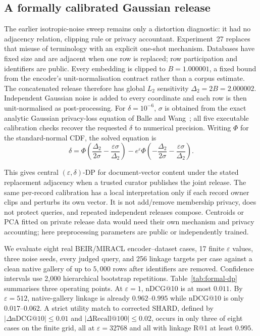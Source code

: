 \subsection{A formally calibrated Gaussian release}\label{ssec:shard-vs-dp}

The earlier isotropic-noise sweep remains only a distortion diagnostic: it
had no adjacency relation, clipping rule or privacy accountant. Experiment~27
replaces that misuse of terminology with an explicit one-shot mechanism.
Databases have fixed size and are adjacent when one row is replaced; row
participation and identifiers are public. Every embedding is clipped to
$B=1.000001$, a fixed bound from the encoder's unit-normalisation contract
rather than a corpus estimate. The concatenated release therefore has global
$L_2$ sensitivity $\Delta_2=2B=2.000002$. Independent Gaussian noise is added
to every coordinate and each row is then unit-normalised as post-processing.
For $\delta=10^{-6}$, $\sigma$ is obtained from the exact analytic Gaussian
privacy-loss equation of Balle and Wang~\cite{ref_analytic_gaussian}; all five
executable calibration checks recover the requested $\delta$ to numerical
precision.
Writing $\Phi$ for the standard-normal CDF, the solved equation is
\[
\delta=\Phi\!\left(\frac{\Delta_2}{2\sigma}
                 -\frac{\varepsilon\sigma}{\Delta_2}\right)
-e^{\varepsilon}\Phi\!\left(-\frac{\Delta_2}{2\sigma}
                 -\frac{\varepsilon\sigma}{\Delta_2}\right).
\]

This gives central $(\varepsilon,\delta)$-DP for document-vector content under
the stated replacement adjacency when a trusted curator publishes the joint
release. The same per-record calibration has a local interpretation only if
each record owner clips and perturbs its own vector. It is not add/remove
membership privacy, does not protect queries, and repeated independent
releases compose. Centroids or PCA fitted on private release data would need
their own mechanism and privacy accounting; here preprocessing parameters are
public or independently trained.

We evaluate eight real BEIR/MIRACL encoder--dataset cases, 17 finite
$\varepsilon$ values, three noise seeds, every judged query, and 256 linkage
targets per case against a clean native gallery of up to $5{,}000$ rows after
identifiers are removed. Confidence intervals use 2,000 hierarchical
bootstrap repetitions. Table~\ref{tab:formal-dp} summarises three operating
points. At $\varepsilon=1$, nDCG@10 is at most $0.011$. By
$\varepsilon=512$, native-gallery linkage is already $0.962$--$0.995$ while
nDCG@10 is only $0.017$--$0.062$. A strict utility match to corrected SHARD,
defined by $|\Delta\mathrm{nDCG@10}|\le0.01$ and
$|\Delta\mathrm{Recall@100}|\le0.02$, occurs in only three of eight cases on
the finite grid, all at $\varepsilon=32768$ and all with linkage R@1 at least
$0.995$.

